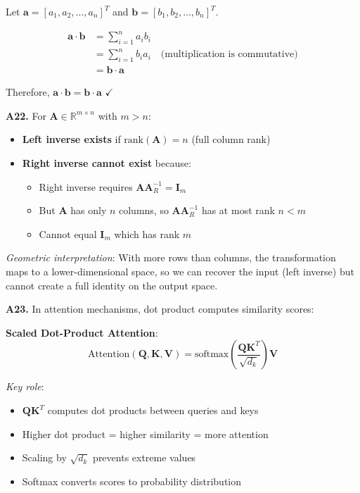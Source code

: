 \documentclass[12pt,a4paper]{article}
\theoremstyle{definition}
\begin{document}
Let $\mathbf{a} = [a_1, a_2, \ldots, a_n]^T$ and $\mathbf{b} = [b_1, b_2, \ldots, b_n]^T$.

\begin{align}
\mathbf{a} \cdot \mathbf{b} &= \sum_{i=1}^{n} a_i b_i \\
&= \sum_{i=1}^{n} b_i a_i \quad \text{(multiplication is commutative)} \\
&= \mathbf{b} \cdot \mathbf{a}
\end{align}

Therefore, $\mathbf{a} \cdot \mathbf{b} = \mathbf{b} \cdot \mathbf{a}$ $\checkmark$

\textbf{A22.} For $\mathbf{A} \in \mathbb{R}^{m \times n}$ with $m > n$:

\begin{itemize}
\item \textbf{Left inverse exists} if $\text{rank}(\mathbf{A}) = n$ (full column rank)
\item \textbf{Right inverse cannot exist} because:
  \begin{itemize}
  \item Right inverse requires $\mathbf{A}\mathbf{A}_R^{-1} = \mathbf{I}_m$
  \item But $\mathbf{A}$ has only $n$ columns, so $\mathbf{A}\mathbf{A}_R^{-1}$ has at most rank $n < m$
  \item Cannot equal $\mathbf{I}_m$ which has rank $m$
  \end{itemize}
\end{itemize}

\textit{Geometric interpretation}: With more rows than columns, the transformation maps to a lower-dimensional space, so we can recover the input (left inverse) but cannot create a full identity on the output space.

\textbf{A23.} In attention mechanisms, dot product computes similarity scores:

\textbf{Scaled Dot-Product Attention}:
\[
\text{Attention}(\mathbf{Q}, \mathbf{K}, \mathbf{V}) = \text{softmax}\left(\frac{\mathbf{Q}\mathbf{K}^T}{\sqrt{d_k}}\right)\mathbf{V}
\]

\textit{Key role}:
\begin{itemize}
\item $\mathbf{Q}\mathbf{K}^T$ computes dot products between queries and keys
\item Higher dot product = higher similarity = more attention
\item Scaling by $\sqrt{d_k}$ prevents extreme values
\item Softmax converts scores to probability distribution
\end{itemize}
\end{document}
